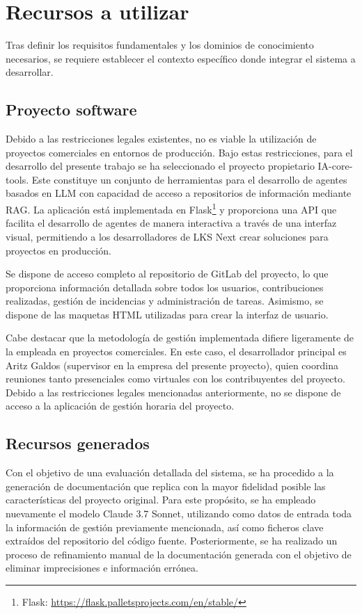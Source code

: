 \section{Recursos a utilizar}
Tras definir los requisitos fundamentales y los dominios de conocimiento necesarios, se requiere establecer el contexto específico donde integrar el sistema a desarrollar. 
\subsection{Proyecto software}

Debido a las restricciones legales existentes, no es viable la utilización de proyectos comerciales en entornos de producción. Bajo estas restricciones, para el desarrollo del presente trabajo se ha seleccionado el proyecto propietario IA-core-tools. Este constituye un conjunto de herramientas para el desarrollo de agentes basados en LLM con capacidad de acceso a repositorios de información mediante RAG. La aplicación está implementada en Flask\footnote{Flask: \url{https://flask.palletsprojects.com/en/stable/}} y proporciona una API que facilita el desarrollo de agentes de manera interactiva a través de una interfaz visual, permitiendo a los desarrolladores de LKS Next crear soluciones para proyectos en producción.

Se dispone de acceso completo al repositorio de GitLab del proyecto, lo que proporciona información detallada sobre todos los usuarios, contribuciones realizadas, gestión de incidencias y administración de tareas. Asimismo, se dispone de las maquetas HTML utilizadas para crear la interfaz de usuario. 

Cabe destacar que la metodología de gestión implementada difiere ligeramente de la empleada en proyectos comerciales. En este caso, el desarrollador principal es Aritz Galdos (supervisor en la empresa del presente proyecto), quien coordina reuniones tanto presenciales como virtuales con los contribuyentes del proyecto. Debido a las restricciones legales mencionadas anteriormente, no se dispone de acceso a la aplicación de gestión horaria del proyecto.

\subsection{Recursos generados}
Con el objetivo de una evaluación detallada del sistema, se ha procedido a la generación de documentación que replica con la mayor fidelidad posible las características del proyecto original. Para este propósito, se ha empleado nuevamente el modelo Claude 3.7 Sonnet, utilizando como datos de entrada toda la información de gestión previamente mencionada, así como ficheros clave extraídos del repositorio del código fuente. Posteriormente, se ha realizado un proceso de refinamiento manual de la documentación generada con el objetivo de eliminar imprecisiones e información errónea.

